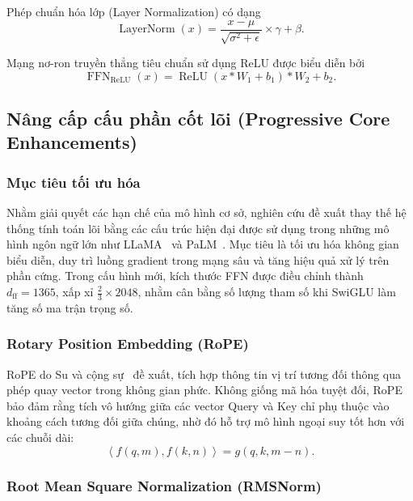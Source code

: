 \documentclass[11pt,a4paper]{article}
\numberwithin{equation}{section}
\begin{document}
Phép chuẩn hóa lớp (Layer Normalization) có dạng
\begin{equation}
\operatorname{LayerNorm}(x)
= \frac{x-\mu}{\sqrt{\sigma^2+\epsilon}}\times\gamma+\beta.
\label{eq:layernorm}
\end{equation}

Mạng nơ-ron truyền thẳng tiêu chuẩn sử dụng ReLU được biểu diễn bởi
\begin{equation}
\operatorname{FFN}_{\mathrm{ReLU}}(x)
= \operatorname{ReLU}(x * W_1+b_1) * W_2+b_2.
\label{eq:ffn-relu}
\end{equation}

\subsection{Nâng cấp cấu phần cốt lõi (Progressive Core Enhancements)}

\subsubsection{Mục tiêu tối ưu hóa}

Nhằm giải quyết các hạn chế của mô hình cơ sở, nghiên cứu đề xuất thay thế hệ thống tính toán lõi bằng các cấu trúc hiện đại được sử dụng trong những mô hình ngôn ngữ lớn như LLaMA~\cite{touvron2023llama} và PaLM~\cite{chowdhery2022palm}. Mục tiêu là tối ưu hóa không gian biểu diễn, duy trì luồng gradient trong mạng sâu và tăng hiệu quả xử lý trên phần cứng. Trong cấu hình mới, kích thước FFN được điều chỉnh thành $d_{\text{ff}}=1365$, xấp xỉ $\frac{2}{3}\times 2048$, nhằm cân bằng số lượng tham số khi SwiGLU làm tăng số ma trận trọng số.

\subsubsection{Rotary Position Embedding (RoPE)}

RoPE do Su và cộng sự~\cite{su2021roformer} đề xuất, tích hợp thông tin vị trí tương đối thông qua phép quay vector trong không gian phức. Không giống mã hóa tuyệt đối, RoPE bảo đảm rằng tích vô hướng giữa các vector Query và Key chỉ phụ thuộc vào khoảng cách tương đối giữa chúng, nhờ đó hỗ trợ mô hình ngoại suy tốt hơn với các chuỗi dài:
\begin{equation}
\left\langle f(q,m),f(k,n)\right\rangle
=g(q,k,m-n).
\label{eq:rope}
\end{equation}

\subsubsection{Root Mean Square Normalization (RMSNorm)}
\end{document}
